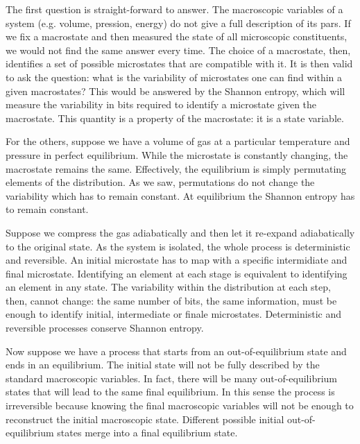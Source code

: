 \documentclass{article}
\begin{document}
The first question is straight-forward to answer. The macroscopic variables of a system (e.g. volume, pression, energy) do not give a full description of its pars. If we fix a macrostate and then measured the state of all microscopic constituents, we would not find the same answer every time. The choice of a macrostate, then, identifies a set of possible microstates that are compatible with it. It is then valid to ask the question: what is the variability of microstates one can find within a given macrostates? This would be answered by the Shannon entropy, which will measure the variability in bits required to identify a microstate given the macrostate. This quantity is a property of the macrostate: it is a state variable.

For the others, suppose we have a volume of gas at a particular temperature and pressure in perfect equilibrium. While the microstate is constantly changing, the macrostate remains the same. Effectively, the equilibrium is simply permutating elements of the distribution. As we saw, permutations do not change the variability which has to remain constant. At equilibrium the Shannon entropy has to remain constant.

Suppose we compress the gas adiabatically and then let it re-expand adiabatically to the original state. As the system is isolated, the whole process is deterministic and reversible. An initial microstate has to map with a specific intermidiate and final microstate. Identifying an element at each stage is equivalent to identifying an element in any state. The variability within the distribution at each step, then, cannot change: the same number of bits, the same information, must be enough to identify initial, intermediate or finale microstates. Deterministic and reversible processes conserve Shannon entropy.

Now suppose we have a process that starts from an out-of-equilibrium state and ends in an equilibrium. The initial state will not be fully described by the standard macroscopic variables. In fact, there will be many out-of-equilibrium states that will lead to the same final equilibrium. In this sense the process is irreversible because knowing the final macroscopic variables will not be enough to reconstruct the initial macroscopic state. Different possible initial out-of-equilibrium states merge into a final equilibrium state.
\end{document}
